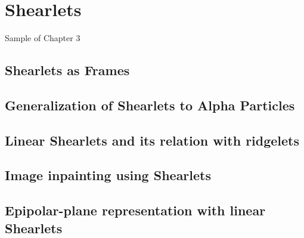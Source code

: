 \chapter{Shearlets}

Sample of Chapter 3

\section{Shearlets as Frames}

\section{Generalization of Shearlets to Alpha Particles}

\section{Linear Shearlets and its relation with ridgelets}

\section{Image inpainting using Shearlets}

\section{Epipolar-plane representation with linear Shearlets}
